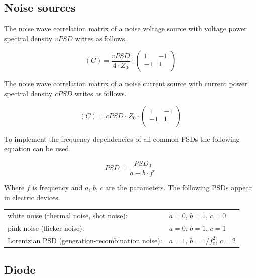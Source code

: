 \documentclass[10pt]{report}
\begin{document}
\subsection{Noise sources}

The noise wave correlation matrix of a noise voltage source with
voltage power spectral density $vPSD$ writes as follows.

\begin{equation}
(\underline{C}) = \frac{vPSD}{4\cdot Z_0}\cdot
\begin{pmatrix}
   1 & -1\\
  -1 &  1\\
\end{pmatrix}
\end{equation}

The noise wave correlation matrix of a noise current source with
current power spectral density $cPSD$ writes as follows.

\begin{equation}
(\underline{C}) = cPSD\cdot Z_0\cdot
\begin{pmatrix}
   1 & -1\\
  -1 &  1\\
\end{pmatrix}
\end{equation}

To implement the frequency dependencies of all common PSDs the
following equation can be used.

\begin{equation}
PSD = \frac{PSD_0}{a+b\cdot f^c}
\end{equation}

Where $f$ is frequency and $a$, $b$, $c$ are the parameters.  The
following PSDs appear in electric devices.

\addvspace{12pt}

\begin{tabular}{ll}
white noise (thermal noise, shot noise):         & $a=0$, $b=1$, $c=0$ \\
pink noise (flicker noise):                      & $a=0$, $b=1$, $c=1$ \\
Lorentzian PSD (generation-recombination noise): & $a=1$, $b=1/f_c^2$, $c=2$ \\
\end{tabular}


\subsection{Diode}
\end{document}
